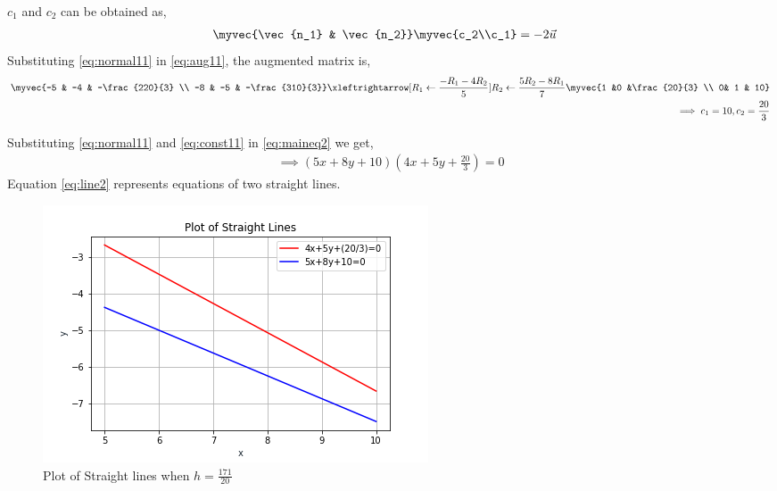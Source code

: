 $c_1$ and $c_2$ can be obtained as,
\begin{align}
\myvec{\vec{n_1} & \vec{n_2}}\myvec{c_2\\c_1}&=-2\vec{u} \label{eq:aug11}
\end{align}
Substituting \eqref{eq:normal11} in \eqref{eq:aug11}, the augmented matrix is,
\begin{align}
\myvec{-5 & -4 & -\frac{220}{3} \\ -8 & -5 & -\frac{310}{3}}
\xleftrightarrow[R_1\leftarrow \frac{-R_1-4R_2}{5}]{R_2\leftarrow \frac{5R_2-8R_1}{7}}
\myvec{1 &0 &\frac{20}{3} \\ 0& 1 & 10} \label{eq:aug21}\\
\implies c_1 = 10, c_2=\frac{20}{3} \label{eq:const11}
\end{align}

Substituting \eqref{eq:normal11} and \eqref{eq:const11} in \eqref{eq:maineq2} we get,
\begin{multline}
\implies \boxed{(5x+8y+10)(4x+5y+\frac{20}{3}) = 0} \label{eq:line2}
\end{multline}
Equation \eqref{eq:line2} represents equations of two straight lines.
\renewcommand{\thefigure}{\arabic{figure}}
\begin{figure}[h!]
	\centering
	\includegraphics[width=\columnwidth]{./solutions/13/ex2/st2.png}
	\caption{Plot of Straight lines when $h=\frac{171}{20}$}
	\label{myfig}
\end{figure}
